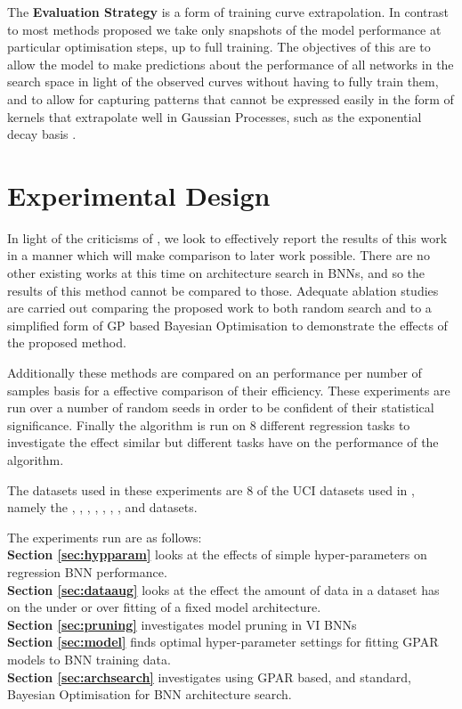 The \textbf{Evaluation Strategy} is a form of training curve extrapolation. In contrast to most methods proposed we take only snapshots of the model performance at particular optimisation steps, up to full training. The objectives of this are to allow the model to make predictions about the performance of all networks in the search space in light of the observed curves without having to fully train them, and to allow for capturing patterns that cannot be expressed easily in the form of kernels that extrapolate well in Gaussian Processes, such as the exponential decay basis \citep{Swersky2014}.

\section{Experimental Design}

In light of the criticisms of \citet{Li}, we look to effectively report the results of this work in a manner which will make comparison to later work possible. There are no other existing works at this time on architecture search in BNNs, and so the results of this method cannot be compared to those. Adequate ablation studies are carried out comparing the proposed work to both random search and to a simplified form of GP based Bayesian Optimisation to demonstrate the effects of the proposed method.

Additionally these methods are compared on an performance per number of samples basis for a effective comparison of their efficiency. These experiments are run over a number of random seeds in order to be confident of their statistical significance. Finally the algorithm is run on 8 different regression tasks to investigate the effect similar but different tasks have on the performance of the algorithm.

The datasets used in these experiments are 8 of the UCI datasets used in \cite{hernandez2015probabilistic}, namely the \bostonname, \concretename, \energyname, \kinname, \powername, \proteinname, \winename, and \yachtname \: datasets.

The experiments run are as follows:\\
\textbf{Section \ref{sec:hypparam}} looks at the effects of simple hyper-parameters on regression BNN performance.\\
\textbf{Section \ref{sec:dataaug}} looks at the effect the amount of data in a dataset has on the under or over fitting of a fixed model architecture.\\
\textbf{Section \ref{sec:pruning}} investigates model pruning in VI BNNs\\
\textbf{Section \ref{sec:model}} finds optimal hyper-parameter settings for fitting GPAR models to BNN training data.\\
\textbf{Section \ref{sec:archsearch}} investigates using GPAR based, and standard, Bayesian Optimisation for BNN architecture search.

